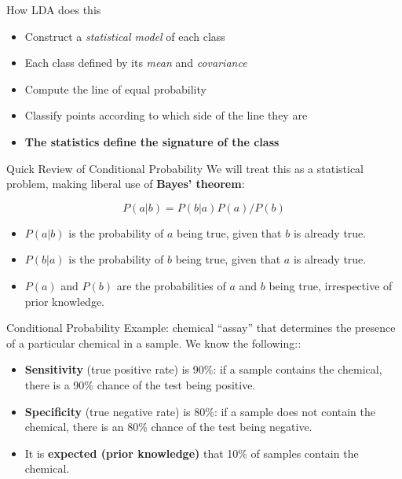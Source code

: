 \documentclass[aspectratio=169]{beamer}
\begin{document}
\begin{frame}{How LDA does this}
  \begin{itemize}
    \item Construct a \textit{statistical model} of each class
    \item Each class defined by its \textit{mean} and \textit{covariance}
    \item Compute the line of equal probability
    \item Classify points according to which side of the line they are
    \pause
    \item \textbf{The statistics define the signature of the class}
  \end{itemize}
\end{frame}


\begin{frame}{Quick Review of Conditional Probability}
  We will treat this as a statistical problem, making liberal use of \textbf{Bayes' theorem}:

  \begin{equation*}
    P(a|b) = P(b|a)P(a)/P(b)
  \end{equation*}

  \begin{itemize}
    \item $P(a|b)$ is the probability of $a$ being true, given that $b$ is already true.
    \item $P(b|a)$ is the probability of $b$ being true, given that $a$ is already true.
    \item $P(a)$ and $P(b)$ are the probabilities of $a$ and $b$ being true, irrespective of prior knowledge.
  \end{itemize}
\end{frame}

\begin{frame}{Conditional Probability}
  Example: chemical ``assay'' that determines the presence of a particular chemical in a sample. We know the following::
  \begin{itemize}
    \item \textbf{Sensitivity} (true positive rate) is 90\%: if a sample contains the chemical, there is a 90\% chance of the test being positive.
    \item \textbf{Specificity} (true negative rate) is 80\%: if a sample does not contain the chemical, there is an 80\% chance of the test being negative.
    \item It is \textbf{expected (prior knowledge)} that 10\% of samples contain the chemical.
  \end{itemize}
\end{frame}
\end{document}
